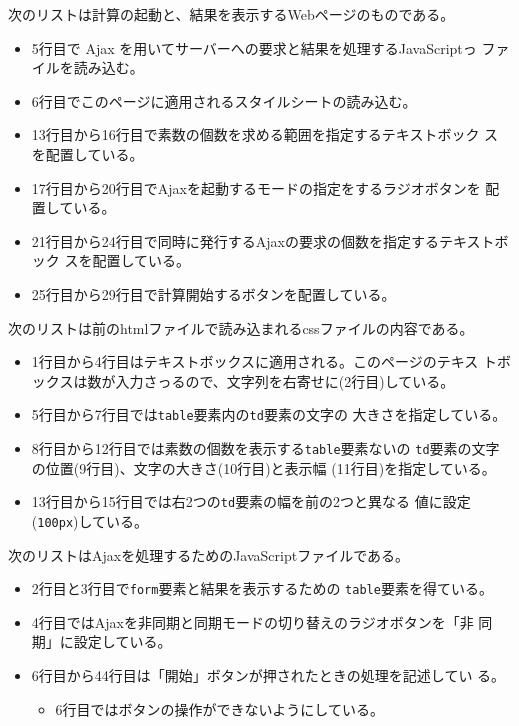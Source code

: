 \begin{Exec}
 次のリストは計算の起動と、結果を表示するWebページのものである。
 \begin{itemize}
  \item 5行目で Ajax を用いてサーバーへの要求と結果を処理するJavaScriptっ
        ファイルを読み込む。
  \item 6行目でこのページに適用されるスタイルシートの読み込む。
  \item 13行目から16行目で素数の個数を求める範囲を指定するテキストボック
        スを配置している。
  \item 17行目から20行目でAjaxを起動するモードの指定をするラジオボタンを
        配置している。
  \item 21行目から24行目で同時に発行するAjaxの要求の個数を指定するテキストボック
        スを配置している。
  \item 25行目から29行目で計算開始するボタンを配置している。
 \end{itemize}
 次のリストは前のhtmlファイルで読み込まれるcssファイルの内容である。
 \begin{itemize}
  \item 1行目から4行目はテキストボックスに適用される。このページのテキス
        トボックスは数が入力さっるので、文字列を右寄せに(2行目)している。
  \item 5行目から7行目では\texttt{table}要素内の\texttt{td}要素の文字の
        大きさを指定している。 
  \item 8行目から12行目では素数の個数を表示する\texttt{table}要素ないの
        \texttt{td}要素の文字の位置(9行目)、文字の大きさ(10行目)と表示幅
        (11行目)を指定している。
  \item 13行目から15行目では右2つの\texttt{td}要素の幅を前の2つと異なる
        値に設定(\texttt{100px})している。
 \end{itemize}
 次のリストはAjaxを処理するためのJavaScriptファイルである。
 \begin{itemize}
  \item 2行目と3行目で\texttt{form}要素と結果を表示するための
        \texttt{table}要素を得ている。
  \item 4行目ではAjaxを非同期と同期モードの切り替えのラジオボタンを「非
        同期」に設定している。
  \item 6行目から44行目は「開始」ボタンが押されたときの処理を記述してい
        る。
        \begin{itemize}
         \item 6行目ではボタンの操作ができないようにしている。

\end{itemize}
\end{itemize}
\end{Exec}
